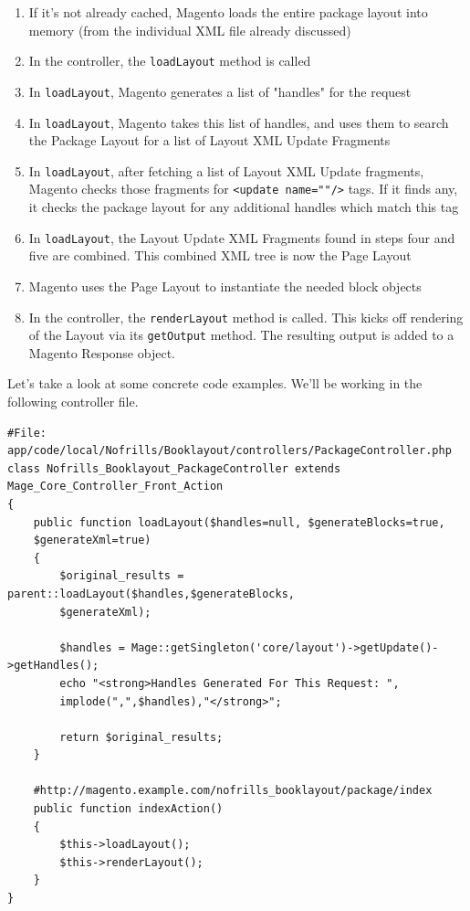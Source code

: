 \documentclass[oneside]{book}
\begin{document}
\begin{enumerate}
\item If it's not already cached, Magento loads the entire package layout into memory (from the individual XML file already discussed)
\item In the controller, the \footnotesize\texttt{loadLayout} \normalsize  method is called
\item In \footnotesize\texttt{loadLayout}\normalsize, Magento generates a list of "handles" for the request
\item In \footnotesize\texttt{loadLayout}\normalsize, Magento takes this list of handles, and uses them to search the Package Layout for a list of Layout XML Update Fragments
\item In \footnotesize\texttt{loadLayout}\normalsize, after fetching a list of Layout XML Update fragments, Magento checks those fragments for \footnotesize\texttt{\textless update name=""/\textgreater } \normalsize  tags.  If it finds any, it checks the package layout for any additional handles which match this tag
\item In \footnotesize\texttt{loadLayout}\normalsize, the Layout Update XML Fragments found in steps four and five are combined.  This combined XML tree is now the Page Layout
\item Magento uses the Page Layout to instantiate the needed block objects
\item In the controller, the \footnotesize\texttt{renderLayout} \normalsize  method is called.  This kicks off rendering of the Layout via its \footnotesize\texttt{getOutput} \normalsize  method.  The resulting output is added to a Magento Response object.
\end{enumerate}


Let's take a look at some concrete code examples. We'll be working in the following controller file.

\begin{lstlisting}
#File: app/code/local/Nofrills/Booklayout/controllers/PackageController.php
class Nofrills_Booklayout_PackageController extends
Mage_Core_Controller_Front_Action
{
    public function loadLayout($handles=null, $generateBlocks=true,
    $generateXml=true)
    {
        $original_results = parent::loadLayout($handles,$generateBlocks,
        $generateXml);

        $handles = Mage::getSingleton('core/layout')->getUpdate()->getHandles();
        echo "<strong>Handles Generated For This Request: ",
        implode(",",$handles),"</strong>";

        return $original_results;
    }

    #http://magento.example.com/nofrills_booklayout/package/index
    public function indexAction()
    {
        $this->loadLayout();
        $this->renderLayout();
    }
}

\end{lstlisting}
\end{document}
